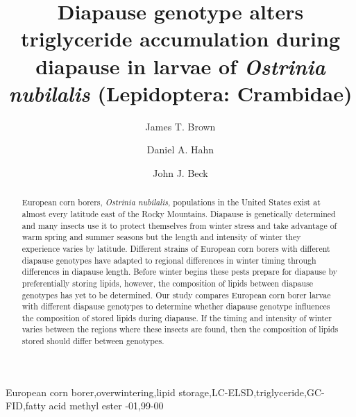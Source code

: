 \documentclass[review]{elsarticle}
\begin{document}
\begin{frontmatter}

\title{Diapause genotype alters triglyceride accumulation during diapause in larvae of \textit{Ostrinia nubilalis} (Lepidoptera: Crambidae)}


\author[usda,uf]{James T. Brown}

\author[uf]{Daniel A. Hahn}
\author[usda]{John J. Beck}

\address[usda]{USDA‐ARS Center for Medical, Agricultural, and Veterinary Entomology, 1700 SW 23rd Drive, Gainesville, FL 32608, USA}

\address[uf]{Department of Entomology and Nematology, University of Florida, Gainesville, FL 32611}



\begin{abstract}
European corn borers, \textit{Ostrinia nubilalis}, populations in the United States exist at almost every latitude east of the Rocky Mountains. Diapause is genetically determined and many insects use it to protect themselves from winter stress and take advantage of warm spring and summer seasons but the length and intensity of winter they experience varies by latitude. Different strains of European corn borers with different diapause genotypes have adapted to regional differences in winter timing through differences in diapause length. Before winter begins these pests prepare for diapause by preferentially storing lipids, however, the composition of lipids between diapause genotypes has yet to be determined. Our study compares European corn borer larvae with different diapause genotypes to determine whether diapause genotype influences the composition of stored lipids during diapause. If the timing and intensity of winter varies between the regions where these insects are found, then the composition of lipids stored should differ between genotypes. 
\end{abstract}

\begin{keyword}
\textttInsect European corn borer\sep overwintering\sep lipid storage\sep LC-ELSD\sep triglyceride\sep GC-FID\sep fatty acid methyl ester 
-01\sep  99-00
\end{keyword}

\end{frontmatter}
\end{document}
